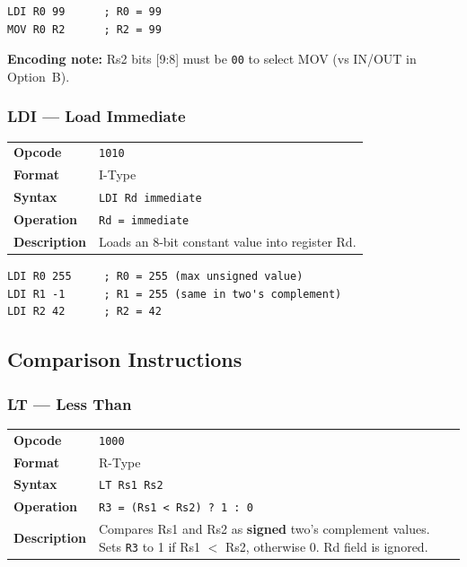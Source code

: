 \documentclass[11pt,a4paper]{article}
\newcommand{\reg}[1]{\texttt{R#1}}
\newcommand{\opcode}[1]{\texttt{#1}}
\begin{document}
\begin{lstlisting}
LDI R0 99      ; R0 = 99
MOV R0 R2      ; R2 = 99
\end{lstlisting}

\textbf{Encoding note:} Rs2 bits [9:8] must be \texttt{00} to select MOV (vs IN/OUT in Option~B).

\subsubsection{LDI --- Load Immediate}

\begin{table}[H]
\begin{tabularx}{\textwidth}{@{}lX@{}}
\toprule
\textbf{Opcode}      & \opcode{1010} \\
\textbf{Format}      & I-Type \\
\textbf{Syntax}      & \lstinline|LDI Rd immediate| \\
\textbf{Operation}   & \texttt{Rd = immediate} \\
\textbf{Description} & Loads an 8-bit constant value into register Rd. \\
\bottomrule
\end{tabularx}
\end{table}

\begin{lstlisting}
LDI R0 255     ; R0 = 255 (max unsigned value)
LDI R1 -1      ; R1 = 255 (same in two's complement)
LDI R2 42      ; R2 = 42
\end{lstlisting}

\subsection{Comparison Instructions}

\subsubsection{LT --- Less Than}

\begin{table}[H]
\begin{tabularx}{\textwidth}{@{}lX@{}}
\toprule
\textbf{Opcode}      & \opcode{1000} \\
\textbf{Format}      & R-Type \\
\textbf{Syntax}      & \lstinline|LT Rs1 Rs2| \\
\textbf{Operation}   & \texttt{R3 = (Rs1 < Rs2) ? 1 : 0} \\
\textbf{Description} & Compares Rs1 and Rs2 as \textbf{signed} two's complement values. Sets \reg{3} to 1 if Rs1 $<$ Rs2, otherwise 0. Rd field is ignored. \\
\bottomrule
\end{tabularx}
\end{table}
\end{document}
